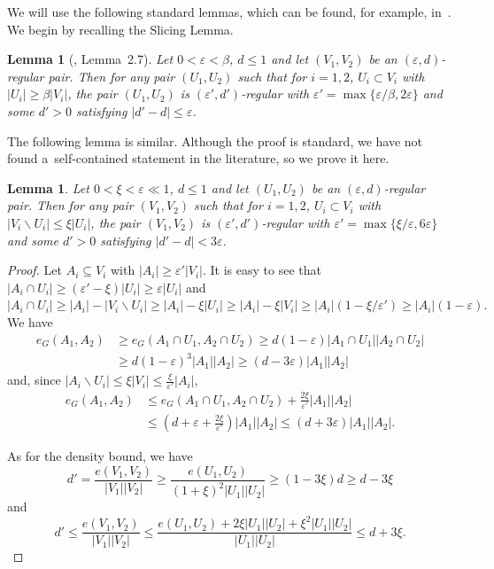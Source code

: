 \documentclass[reqno, 12pt]{amsart}
\numberwithin{equation}{section}
\numberwithin{figure}{section}
\theoremstyle{plain}
\newtheorem{lemma}[thm]{Lemma}
\theoremstyle{definition}
\let\eps=\varepsilon
\let\setminus=\smallsetminus
\begin{document}
    We will use the following standard lemmas, which can be found, for example, in~\cite{abcd22,ks95}. We begin by recalling the Slicing Lemma.
	
    \begin{lemma}[\cite{abcd22}, Lemma~2.7]\label{l:slicing}
        Let $0 < \eps < \beta$, $d \leq 1$ and let $(V_1,V_2)$ be an $(\eps,d)$-regular pair. Then for any pair $(U_1, U_2)$ such that for $i=1,2$, $U_i\subset V_i$ with $|U_i| \geq \beta |V_i|$, the pair $(U_1,U_2)$ is $(\eps', d')$-regular with $\eps' = \max\{\eps/\beta, 2\eps \}$ and some $d'>0$ satisfying $|d' -d|\leq \eps$.
    \end{lemma}

    The following lemma is similar. Although the proof is standard, we have not found a~self-contained statement in the literature, so we prove it here.

    \begin{lemma}\label{l:slicing-adding}
        Let $0<\xi<\eps \ll 1$, $d\leq 1$ and let $(U_1, U_2)$ be an $(\eps,d)$-regular pair. Then for any pair $(V_1,V_2)$ such that for $i=1,2$, $U_i\subset V_i$ with $|V_i\setminus U_i|\leq \xi |U_i|$, the pair $(V_1,V_2)$ is $(\eps', d')$-regular with $\eps'= \max\{\xi/\eps, 6\eps\}$ and some $d'>0$ satisfying $|d'-d|<3\eps $.
    \end{lemma}
        
            
    \begin{proof}
        Let $A_i\subseteq V_i$ with $|A_i|\geq \eps' |V_i|$. It is easy to see that $|A_i\cap U_i|\geq (\eps'-\xi)|U_i|\geq \eps |U_i|$ and $|A_i\cap U_i| \geq |A_i|-|V_i\setminus U_i|\geq |A_i|-\xi|U_i|\geq|A_i|-\xi|V_i|\geq |A_i|(1-\xi/\eps')\geq |A_i|(1-\eps).$ 
        We have 
        \begin{align*}
            e_G(A_1,A_2)&\geq e_G(A_1\cap U_1, A_2 \cap U_2) \geq d(1-\eps)|A_1\cap U_1||A_2\cap U_2|\\
            &\geq d (1-\eps)^3|A_1||A_2| \geq (d-3\eps)|A_1||A_2|
        \end{align*}
        and, since $|A_i\setminus U_i|\leq \xi|V_i|\leq \frac{\xi}{\eps'}|A_i|$,
        \begin{align*}
            e_G(A_1,A_2) &\leq e_G(A_1\cap U_1, A_2 \cap U_2)+\frac{2\xi}{\eps'}|A_1||A_2| \\
            &\leq \left(d+\eps+\frac{2\xi}{\eps'}\right)|A_1||A_2| \leq (d+3\eps)|A_1||A_2|.
        \end{align*}
        
        As for the density bound, we have 
        \[d'=\frac{e(V_1,V_2)}{|V_1||V_2|} \geq \frac{e(U_1,U_2)}{(1+\xi)^2|U_1||U_2|} \geq (1-3\xi)d \geq d - 3\xi\]
        and 
        \[d'\leq \frac{e(V_1,V_2)}{|V_1||V_2|}\leq  \frac{e(U_1,U_2)+2\xi|U_1||U_2|+\xi^2|U_1||U_2|}{|U_1||U_2|}\leq d+3\xi.\]
    \end{proof}
	
\end{document}
